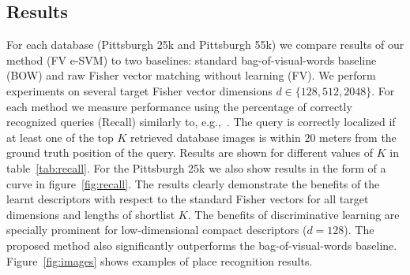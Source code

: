 \documentclass[table]{article} %
\begin{document}
		
%



	\subsection{Results}		
		For each database (Pittsburgh 25k and Pittsburgh 55k) we compare results of our method (FV e-SVM) to two baselines: standard bag-of-visual-words baseline (BOW) and raw Fisher vector matching without learning (FV). 
		 We perform experiments on several target Fisher vector dimensions $d\in\{128,512,2048\}$. For each method we measure performance using the percentage of correctly recognized queries (Recall) similarly to, e.g.,~\cite{Chen11,Knopp2010,Sattler-BMVC12}. The query is correctly localized if at least one of the top $K$ retrieved database images is within $20$ meters from the ground truth position of the query. Results are shown for different values of $K$ in table~\ref{tab:recall}. For the Pittsburgh 25k we also show results in the form of a curve in figure~\ref{fig:recall}. 
		The results clearly demonstrate the benefits of the learnt descriptors with respect to the standard Fisher vectors for all target dimensions and lengths of shortlist $K$. The benefits of discriminative learning are specially prominent for low-dimensional compact descriptors ($d=128$). 
		 The proposed method also significantly outperforms the bag-of-visual-words baseline. 
		 Figure~\ref{fig:images} shows examples of place recognition results. 
		 
\end{document}
